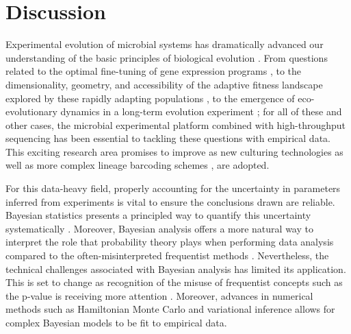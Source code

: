 \documentclass[
  letterpaper,
  DIV=11,
  numbers=noendperiod]{scrartcl}
\begin{document}
\begin{refsegment}
\begin{figure}
\end{figure}

\hypertarget{discussion}{%
\section{Discussion}\label{discussion}}

Experimental evolution of microbial systems has dramatically advanced
our understanding of the basic principles of biological evolution
\autocite{kussell2013}. From questions related to the optimal
fine-tuning of gene expression programs \autocite{Dekel2005}, to the
dimensionality, geometry, and accessibility of the adaptive fitness
landscape explored by these rapidly adapting populations
\autocite{kinsler2020,maeda2020}, to the emergence of eco-evolutionary
dynamics in a long-term evolution experiment \autocite{good2017}; for
all of these and other cases, the microbial experimental platform
combined with high-throughput sequencing has been essential to tackling
these questions with empirical data. This exciting research area
promises to improve as new culturing technologies \autocite{jagdish2022}
as well as more complex lineage barcoding schemes
\autocite{nguyenba2019a,yang2022}, are adopted.

For this data-heavy field, properly accounting for the uncertainty in
parameters inferred from experiments is vital to ensure the conclusions
drawn are reliable. Bayesian statistics presents a principled way to
quantify this uncertainty systematically \autocite{gelman2010}.
Moreover, Bayesian analysis offers a more natural way to interpret the
role that probability theory plays when performing data analysis
compared to the often-misinterpreted frequentist methods
\autocite{vanderplas2014}. Nevertheless, the technical challenges
associated with Bayesian analysis has limited its application. This is
set to change as recognition of the misuse of frequentist concepts such
as the p-value is receiving more attention \autocite{nuzzo2014}.
Moreover, advances in numerical methods such as Hamiltonian Monte Carlo
\autocite{betancourt2017} and variational inference
\autocite{kucukelbir2016} allows for complex Bayesian models to be fit
to empirical data.


\end{refsegment}
\end{document}
